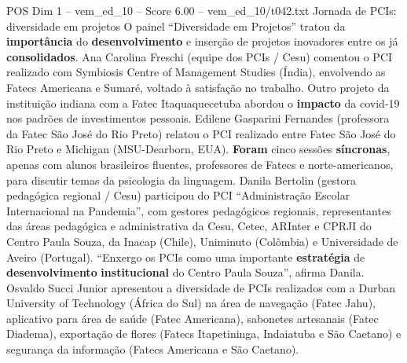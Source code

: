 \begin{textsample}{POS Dim 1 – vem\_ed\_10 – Score 6.00 – vem\_ed\_10/t042.txt}  \label{ex:f1_pos_122}
Jornada de PCIs: diversidade em projetos O painel “Diversidade em Projetos” tratou da \textbf{importância} do \textbf{desenvolvimento} e inserção de projetos inovadores entre os já \textbf{consolidados}.
Ana Carolina Freschi (equipe dos PCIs / Cesu) comentou o PCI realizado com Symbiosis Centre of Management Studies (Índia), envolvendo as Fatecs Americana e Sumaré, voltado à satisfação no trabalho.
Outro projeto da instituição indiana com a Fatec Itaquaquecetuba abordou o \textbf{impacto} da covid-19 nos padrões de investimentos pessoais.
Edilene Gasparini Fernandes (professora da Fatec São José do Rio Preto) relatou o PCI realizado entre Fatec São José do Rio Preto e Michigan (MSU-Dearborn, EUA). \textbf{Foram} cinco sessões \textbf{síncronas}, apenas com alunos brasileiros fluentes, professores de Fatecs e norte-americanos, para discutir temas da psicologia da linguagem.
Danila Bertolin (gestora pedagógica regional / Cesu) participou do PCI “Administração Escolar Internacional na Pandemia”, com gestores pedagógicos regionais, representantes das áreas pedagógica e administrativa da Cesu, Cetec, ARInter e CPRJI do Centro Paula Souza, da Inacap (Chile), Uniminuto (Colômbia) e Universidade de Aveiro (Portugal). “Enxergo os PCIs como uma importante \textbf{estratégia} de \textbf{desenvolvimento} \textbf{institucional} do Centro Paula Souza”, afirma Danila.
Osvaldo Succi Junior apresentou a diversidade de PCIs realizados com a Durban University of Technology (África do Sul) na área de navegação (Fatec Jahu), aplicativo para área de saúde (Fatec Americana), sabonetes artesanais (Fatec Diadema), exportação de flores (Fatecs Itapetininga, Indaiatuba e São Caetano) e segurança da informação (Fatecs Americana e São Caetano).

\end{textsample}
